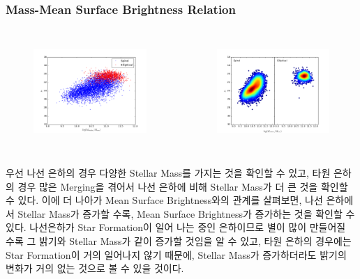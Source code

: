 \documentclass[xcolor={dvipsnames,table}]{beamer}
\newcommand\SSM{\fontsize{7}{7.2}\selectfont}
\begin{document}
\begin{frame}
 \frametitle{Mass-Mean Surface Brightness Relation}
 \SSM
 \begin{columns}[t]
   \begin{figure}
    \centering
    \includegraphics[width=6cm, height=4cm]{masssurf.png}
   \end{figure}
   \begin{figure}
    \centering
    \includegraphics[width=6cm, height=4cm]{masssurfdensity.png}
   \end{figure}
  \end{columns}
\vspace{0.3cm}
우선 나선 은하의 경우 다양한 Stellar Mass를 가지는 것을 확인할 수 있고, 타원 은하의 경우 많은 Merging을 겪어서 나선 은하에
비해 Stellar Mass가 더 큰 것을 확인할 수 있다. 이에 더 나아가 Mean Surface Brightness와의 관계를 살펴보면, 나선 은하에서
Stellar Mass가 증가할 수록, Mean Surface Brightness가 증가하는 것을 확인할 수 있다. 나선은하가 Star Formation이 일어
나는 중인 은하이므로 별이 많이 만들어질 수록 그 밝기와 Stellar Mass가 같이 증가할 것임을 알 수 있고, 타원 은하의 경우에는
Star Formation이 거의 일어나지 않기 때문에, Stellar Mass가 증가하더라도 밝기의 변화가 거의 없는 것으로 볼 수 있을 것이다.
\end{frame}
\end{document}
